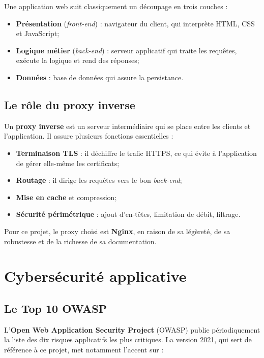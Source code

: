 Une application web suit classiquement un découpage en trois couches :

\begin{itemize}
  \item \textbf{Présentation} (\emph{front-end}) : navigateur du
        client, qui interprète HTML, CSS et JavaScript;
  \item \textbf{Logique métier} (\emph{back-end}) : serveur applicatif
        qui traite les requêtes, exécute la logique et rend des
        réponses;
  \item \textbf{Données} : base de données qui assure la persistance.
\end{itemize}

\subsection{Le rôle du proxy inverse}

Un \textbf{proxy inverse} est un serveur intermédiaire qui se place
entre les clients et l'application. Il assure plusieurs fonctions
essentielles :

\begin{itemize}
  \item \textbf{Terminaison TLS} : il déchiffre le trafic HTTPS, ce qui
        évite à l'application de gérer elle-même les certificats;
  \item \textbf{Routage} : il dirige les requêtes vers le bon
        \emph{back-end};
  \item \textbf{Mise en cache} et compression;
  \item \textbf{Sécurité périmétrique} : ajout d'en-têtes, limitation
        de débit, filtrage.
\end{itemize}

Pour ce projet, le proxy choisi est \textbf{Nginx}, en raison de sa
légèreté, de sa robustesse et de la richesse de sa documentation.

\section{Cybersécurité applicative}

\subsection{Le Top 10 OWASP}

L'\textbf{Open Web Application Security Project} (OWASP) publie
périodiquement la liste des dix risques applicatifs les plus
critiques. La version 2021, qui sert de référence à ce projet, met
notamment l'accent sur \cite{owasp-top10} :

